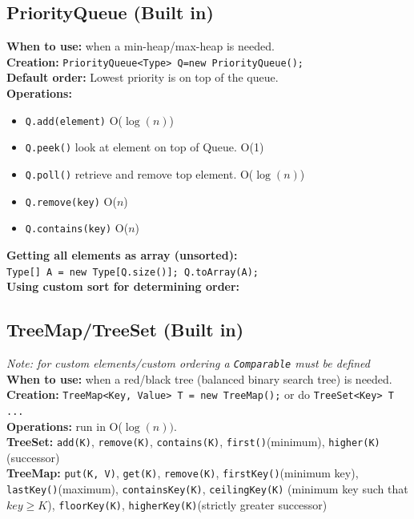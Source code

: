 \documentclass[a4paper,10pt]{article}
\begin{document}
\begin{multicols}{2}
\subsection{PriorityQueue (Built in)}
\textbf{When to use:} when a min-heap/max-heap is needed.\\
\textbf{Creation:} \lstinline|PriorityQueue<Type> Q=new PriorityQueue();|\\
\textbf{Default order:} Lowest priority is on top of the queue.\\
\textbf{Operations:}
\begin{itemize}[nolistsep,noitemsep]
\itemsep0em
\item \lstinline|Q.add(element)| O($\log(n)$)
\item \lstinline|Q.peek()| look at element on top of Queue. O(1)
\item \lstinline|Q.poll()| retrieve and remove top element. O($\log(n)$)
\item \lstinline|Q.remove(key)| O($n$)
\item \lstinline|Q.contains(key)| O($n$)
\end{itemize}
\textbf{Getting all elements as array (unsorted):} \\ 
\lstinline|Type[] A = new Type[Q.size()]; Q.toArray(A); |\\
\textbf{Using custom sort for determining order:}


\subsection{TreeMap/TreeSet (Built in)}
\textit{Note: for custom elements/custom ordering a \lstinline|Comparable| must be defined}\\
\textbf{When to use:} when a red/black tree (balanced binary search tree) is needed.\\
\textbf{Creation:} \lstinline|TreeMap<Key, Value> T = new TreeMap();| or  do \lstinline|TreeSet<Key> T ...|\\
\textbf{Operations:} run in O($\log(n))$.\\
\textbf{TreeSet:} \lstinline|add(K)|, \lstinline|remove(K)|, \lstinline|contains(K)|, \lstinline|first()|(minimum), \lstinline|higher(K)|(successor)
\\
\textbf{TreeMap:} \lstinline|put(K, V)|, \lstinline|get(K)|, \lstinline|remove(K)|, \lstinline|firstKey()|(minimum key), \lstinline|lastKey()|(maximum), \lstinline|containsKey(K)|, \lstinline|ceilingKey(K)| (minimum key such that $key\geq K$), \lstinline|floorKey(K)|, \lstinline|higherKey(K)|(strictly greater successor)


\end{multicols}
\end{document}
